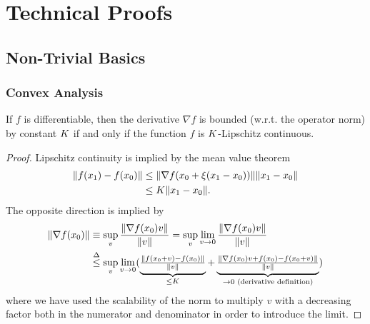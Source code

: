 
\chapter{Technical Proofs}

\section{Non-Trivial Basics}

\subsection{Convex Analysis}

\begin{lemma}\label{lem-appendix: lipschitz and bounded derivative}
	If \(f\) is differentiable, then the derivative \(\nabla f\) is
	bounded (w.r.t. the operator norm) by constant \(K\) if and only if the function
	\(f\) is \(K\)-Lipschitz continuous.
\end{lemma}
\begin{proof}
	Lipschitz continuity is implied by the mean value theorem
	\begin{align*}
		\|f(x_1) - f(x_0)\|
		&\le \|\nabla f(x_0 + \xi(x_1-x_0))\| \|x_1- x_0\|\\
		&\le K \|x_1-x_0\|.
	\end{align*}
	The opposite direction is implied by
	\begin{align*}
		\|\nabla f(x_0)\|
		&\equiv \sup_{v} \frac{\|\nabla f(x_0)v\|}{\|v\|}
		= \sup_{v} \lim_{v\to 0}\frac{\|\nabla f(x_0)v\|}{\|v\|}\\
		&\lxle{\Delta}\sup_{v} \lim_{v\to 0}
		(
			\underbrace{
				\tfrac{\|f(x_0 + v) - f(x_0) \|}{\|v\|}
			}_{
				\le \lipConst 
			}
			+ \underbrace{
				\tfrac{\|\nabla f(x_0)v + f(x_0) - f(x_0 +v)\|}{\|v\|}
			}_{
				\to 0 \text{ (derivative definition)}
			}
		)
	\end{align*}
	where we have used the scalability of the norm to multiply \(v\) with a
	decreasing factor both in the numerator and denominator in order to introduce
	the limit.
\end{proof}

